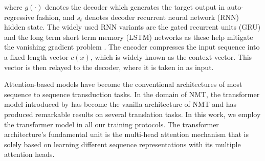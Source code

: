 \documentclass[11pt,a4paper]{article}
\begin{document}
where $g(\cdot)$ denotes the decoder which generates the target output in auto-regressive fashion, and $s_{t}$ denotes decoder recurrent neural network (RNN) hidden state. The widely used RNN variants are the gated recurrent units (GRU) and the long term short term memory (LSTM) networks as these help mitigate the vanishing gradient problem \cite{pouget2014overcoming}. The encoder compresses the input sequence into a fixed length vector $c(x)$, which is widely known as the context vector. This vector is then relayed to the decoder, where it is taken in as input.

Attention-based models \citep{ bahdanau2014neural,chorowski2015attention, luong2015effective} have become the conventional architectures of most sequence to sequence transduction tasks. In the domain of NMT, the transformer model introduced by \citet{vaswani2017attention} has become the vanilla architecture of NMT and has produced remarkable results on several translation tasks. In this work, we employ the transformer model in all our training protocols. The transformer architecture's fundamental unit is the multi-head attention mechanism that is solely based on learning different sequence representations with its multiple attention heads.  
\end{document}
